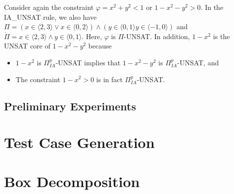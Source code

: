 \begin{example}
Consider again the constraint $\varphi = x^2 + y^2 < 1$ or $1 - x^2 - y^2 > 0$. In the \tiny IA\_UNSAT \normalsize rule, we also have $\Pi = (x \in \langle 2, 3 \rangle \vee x \in \langle 0, 2 \rangle) \wedge (y \in \langle 0, 1 \rangle y \in \langle -1, 0 \rangle)$ and $\mathring\Pi = x \in \langle 2, 3 \rangle \wedge y \in \langle 0, 1 \rangle$. Here, $\varphi$ is $\Pi$-UNSAT. In addition, $1 - x^2$ is the UNSAT core of $1 - x^2 - y^2$ because 
\begin{itemize}
\item $1 - x^2$ is $\Pi^p_{IA}$-UNSAT implies that $1 - x^2 - y^2$ is $\Pi^p_{IA}$-UNSAT, and 
\item The constraint $1 - x^2 > 0$ is in fact $\Pi^p_{IA}$-UNSAT.
\end{itemize} 
\end{example}

\subsection*{Preliminary Experiments}

\section{Test Case Generation}
\section{Box Decomposition}